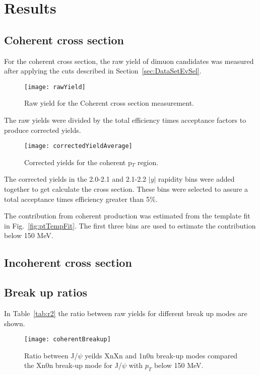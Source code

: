 \chapter{Results} 
  \section{Coherent cross section}
  For the coherent cross section, the raw yield of dimuon candidates was
    measured after applying the cuts described in Section~\ref{sec:DataSetEvSel}.
  \begin{figure}[!Hhtb]
    \centering
    \texttt{[image: rawYield]}
    \caption{Raw yield for the Coherent cross section measurement.}
    \label{fig:rawYieldCo}
  \end{figure}

  The raw yields were divided by the total efficiency times acceptance factors
    to produce corrected yields.
  \begin{figure}[!Hhtb]
    \centering
    \texttt{[image: correctedYieldAverage]}
    \caption{Corrected yields for the coherent p$_{T}$ region.}
    \label{fig:corYieldCo}
  \end{figure}

  The corrected yields in the 2.0-2.1 and 2.1-2.2 $|y|$ rapidity bins were added 
    together to get calculate the cross section. 
  These bins were selected to assure a total acceptance times efficiency 
    greater than 5\%.

  The contribution from coherent production was estimated from the template fit
    in Fig.~\ref{fig:ptTempFit}.
  The first three bins are used to estimate the contribution below 150 MeV.

  \section{Incoherent cross section}
  \section{Break up ratios}
    In Table~\ref{tab:r2} the ratio between raw yields for different break up 
      modes are shown.
    \begin{figure}[!Hhtb]
      \centering
      \texttt{[image: coherentBreakup]}
      \caption{Ratio between J/$\psi$ yeilds XnXn and 1n0n break-up modes 
        compared the Xn0n break-up mode for J/$\psi$ with $p_{T}$ below 150 
        MeV.}
      \label{fig:coherentBreakUp}
    \end{figure}
   
